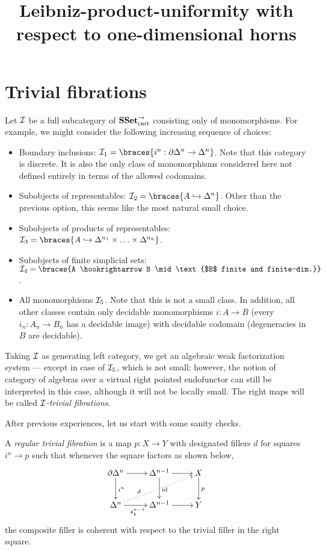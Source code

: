 \documentclass[reqno,10pt,a4paper,oneside]{amsart}
\begin{document}
\title{Leibniz-product-uniformity with respect to one-dimensional horns}

\maketitle

\section*{Trivial fibrations}

Let $\cal{I}$ be a full subcategory of $\SSetCart$ consisting only of monomorphisms.
For example, we might consider the following increasing sequence of choices:
\begin{itemize}
\item
Boundary inclusions: $\cal{I}_1 = \braces{i^n : \partial \Delta^n \to \Delta^n}$.
Note that this category is discrete.
It is also the only class of monomorphisms considered here not defined entirely in terms of the allowed codomains.
\item
Subobjects of representables: $\cal{I}_2 = \braces{A \hookrightarrow \Delta^n}$.
Other than the previous option, this seems like the most natural small choice.
\item
Subobjects of products of representables: $\cal{I}_3 = \braces{A \hookrightarrow \Delta^{n_1} \times \ldots \times \Delta^{n_k}}$.
\item
Subobjects of finite simplicial sets: $\cal{I}_4 = \braces{A \hookrightarrow B \mid \text{$B$ finite and finite-dim.}}$.
\item
All monomorphisms $\cal{I}_5$.
Note that this is not a small class.
In addition, all other classes contain only decidable monomorphisms $i : A \to B$ (\ie every $i_n : A_n \to B_n$ has a decidable image) with decidable codomain (\ie degeneracies in $B$ are decidable).
\end{itemize}

Taking $\cal{I}$ as generating left category, we get an algebraic weak factorization system --- except in case of $\cal{I}_5$, which is not small; however, the notion of category of algebras over a virtual right pointed endofunctor can still be interpreted in this case, although it will not be locally small.
The right maps will be called \emph{$\cal{I}$-trivial fibrations}.

After previous experiences, let us start with some sanity checks.

\begin{definition}
A \emph{regular trivial fibration} is a map $p : X \to Y$ with designated fillers $d$ for squares $i^n \to p$ such that whenever the square factors as shown below,
\[
\xymatrix{
  \partial \Delta^n
  \ar[r]
  \ar[d]^{i^n}
&
  \Delta^{n-1}
  \ar[r]
  \ar[d]^{\id}
&
  X
  \ar[d]^{p}
\\
  \Delta^n
  \ar[r]_{s_k^{n-1}}
  \ar@{.>}[urr]^(0.3){d}
&
  \Delta^{n-1}
  \ar[r]
&
  Y
}
\]
the composite filler is coherent with respect to the trivial filler in the right square.
\end{definition}
\end{document}
